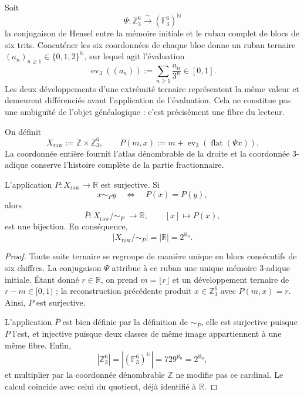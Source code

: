 Soit
\[
 \Psi:\mathbb Z_3^6\xrightarrow{\ \sim\ }
       (\mathbb F_3^6)^{\mathbb N}
\]
la conjugaison de Hensel entre la mémoire initiale et le ruban complet de
blocs de six trits. Concaténer les six coordonnées de chaque bloc donne
un ruban ternaire
\(
 (a_n)_{n\geq 1}\in\{0,1,2\}^{\mathbb N}
\), sur lequel agit l'évaluation
\[
 \operatorname{ev}_3((a_n))
 :=\sum_{n\geq1}\frac{a_n}{3^n}\in[0,1].
\]
Les deux développements d'une extrémité ternaire représentent la même valeur et
demeurent différenciés avant l'application de l'évaluation. Cela ne constitue pas
une ambiguïté de l'objet généalogique : c'est précisément une fibre du lecteur.

On définit
\[
 X_{\mathrm{raw}}:=\mathbb Z\times\mathbb Z_3^6,
 \qquad
 P(m,x):=m+\operatorname{ev}_3(\operatorname{flat}(\Psi x)).
\]
La coordonnée entière fournit l'atlas dénombrable de la droite et la
coordonnée 3-adique conserve l'histoire complète de la partie fractionnaire.

\begin{theorem}
\label{p12-83-c18-s2:hmtch:thm-cociente-real}
L'application \(P:X_{\mathrm{raw}}\to\mathbb R\) est surjective. Si
\[
 x\sim_P y
 \quad\Longleftrightarrow\quad
 P(x)=P(y),
\]
alors
\[
 \overline P:X_{\mathrm{raw}}/\!\sim_P\;\longrightarrow\mathbb R,
 \qquad [x]\longmapsto P(x),
\]
est une bijection. En conséquence,
\[
 \left|X_{\mathrm{raw}}/\!\sim_P\right|
 =|\mathbb R|
 =2^{\aleph_0}.
\]
\end{theorem}

\begin{proof}
Toute suite ternaire se regroupe de manière unique en blocs consécutifs de
six chiffres. La conjugaison \(\Psi\) attribue à ce ruban une unique mémoire
3-adique initiale. Étant donné \(r\in\mathbb R\), on prend
\(m=\lfloor r\rfloor\) et un développement ternaire de
\(r-m\in[0,1)\) ; la reconstruction précédente produit
\(x\in\mathbb Z_3^6\) avec \(P(m,x)=r\). Ainsi, \(P\) est surjective.

L'application \(\overline P\) est bien définie par la définition de
\(\sim_P\), elle est surjective puisque \(P\) l'est, et injective puisque deux
classes de même image appartiennent à une même fibre. Enfin,
\[
 |\mathbb Z_3^6|
 =\left|(\mathbb F_3^6)^{\mathbb N}\right|
 =729^{\aleph_0}
 =2^{\aleph_0},
\]
et multiplier par la coordonnée dénombrable \(\mathbb Z\) ne modifie pas ce
cardinal. Le calcul coïncide avec celui du quotient, déjà identifié à
\(\mathbb R\).
\end{proof}

